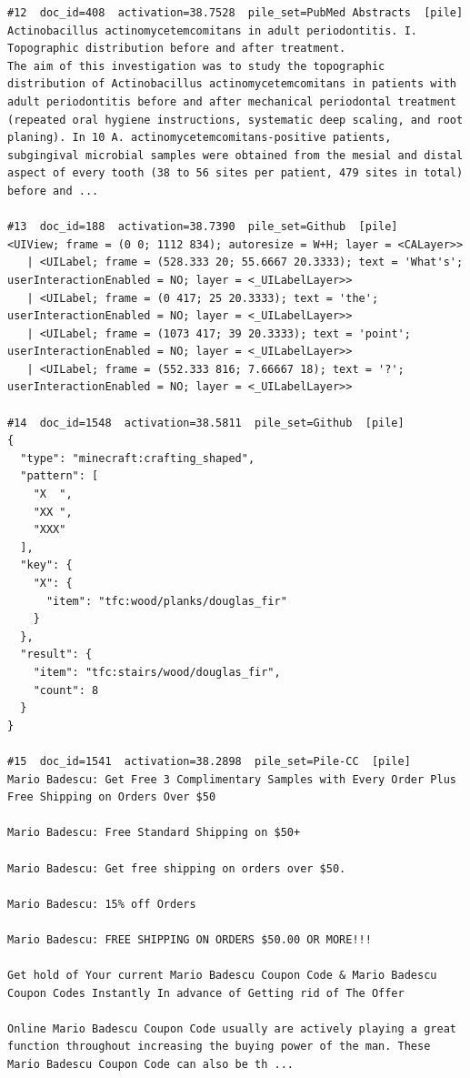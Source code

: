\begin{verbatim}
#12  doc_id=408  activation=38.7528  pile_set=PubMed Abstracts  [pile]
Actinobacillus actinomycetemcomitans in adult periodontitis. I. Topographic distribution before and after treatment.
The aim of this investigation was to study the topographic distribution of Actinobacillus actinomycetemcomitans in patients with adult periodontitis before and after mechanical periodontal treatment (repeated oral hygiene instructions, systematic deep scaling, and root planing). In 10 A. actinomycetemcomitans-positive patients, subgingival microbial samples were obtained from the mesial and distal aspect of every tooth (38 to 56 sites per patient, 479 sites in total) before and ...

#13  doc_id=188  activation=38.7390  pile_set=Github  [pile]
<UIView; frame = (0 0; 1112 834); autoresize = W+H; layer = <CALayer>>
   | <UILabel; frame = (528.333 20; 55.6667 20.3333); text = 'What's'; userInteractionEnabled = NO; layer = <_UILabelLayer>>
   | <UILabel; frame = (0 417; 25 20.3333); text = 'the'; userInteractionEnabled = NO; layer = <_UILabelLayer>>
   | <UILabel; frame = (1073 417; 39 20.3333); text = 'point'; userInteractionEnabled = NO; layer = <_UILabelLayer>>
   | <UILabel; frame = (552.333 816; 7.66667 18); text = '?'; userInteractionEnabled = NO; layer = <_UILabelLayer>>

#14  doc_id=1548  activation=38.5811  pile_set=Github  [pile]
{
  "type": "minecraft:crafting_shaped",
  "pattern": [
    "X  ",
    "XX ",
    "XXX"
  ],
  "key": {
    "X": {
      "item": "tfc:wood/planks/douglas_fir"
    }
  },
  "result": {
    "item": "tfc:stairs/wood/douglas_fir",
    "count": 8
  }
}

#15  doc_id=1541  activation=38.2898  pile_set=Pile-CC  [pile]
Mario Badescu: Get Free 3 Complimentary Samples with Every Order Plus Free Shipping on Orders Over $50

Mario Badescu: Free Standard Shipping on $50+

Mario Badescu: Get free shipping on orders over $50.

Mario Badescu: 15% off Orders

Mario Badescu: FREE SHIPPING ON ORDERS $50.00 OR MORE!!!

Get hold of Your current Mario Badescu Coupon Code & Mario Badescu Coupon Codes Instantly In advance of Getting rid of The Offer

Online Mario Badescu Coupon Code usually are actively playing a great function throughout increasing the buying power of the man. These Mario Badescu Coupon Code can also be th ...


\end{verbatim}
